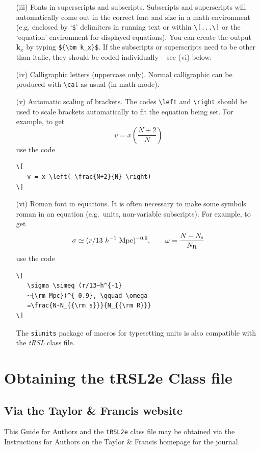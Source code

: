 \documentclass[]{tRSL2e}
\begin{document}
\begin{enumerate}
\item[(iii)] Fonts in superscripts and subscripts. Subscripts and superscripts will automatically come  out in the correct font
and size in a math environment (e.g. enclosed by `\verb"$"'
delimiters in running text or within \verb"\[...\]" or the
`equation' environment for displayed equations). You can create
the output ${\bm k_x}$ by typing \verb"${\bm k_x}$". If the
subscripts or superscripts need to be other than italic, they
should be coded individually -- see (vi) below.

\item[(iv)] Calligraphic letters (uppercase only).
%
%
Normal calligraphic can be produced with \verb"\cal" as usual (in
math mode).

\item[(v)] Automatic scaling of brackets. The codes \verb"\left" and
\verb"\right" should  be used to scale brackets automatically to
fit the equation being set. For example, to get
\[
   v = x \left( \frac{N+2}{N} \right)
\]
use the code
%
\begin{verbatim}
\[
   v = x \left( \frac{N+2}{N} \right)
\]
\end{verbatim}

\item[(vi)] Roman font in equations. It is often necessary to make some
symbols roman in an equation (e.g.\ units, non-variable
subscripts). For example, to get
\[
   \sigma \simeq (r/13~h^{-1}~{\rm Mpc})^{-0.9},
   \qquad \omega = \frac{N-N_{\rm s}}{N_{\rm R}}
\]
\noindent use the code
%
\begin{verbatim}
\[
   \sigma \simeq (r/13~h^{-1}
   ~{\rm Mpc})^{-0.9}, \qquad \omega
   =\frac{N-N_{{\rm s}}}{N_{{\rm R}}}
\]
\end{verbatim}
The {\tt siunits} package of macros for typesetting units is also compatible with the {\it tRSL} class file.
\end{enumerate}


\section{Obtaining the tRSL2e Class file}\label{FTP}

\subsection{Via the Taylor \& Francis website}

This Guide for Authors and the \verb"tRSL2e" class file may be obtained via the Instructions for Authors
on the Taylor \& Francis homepage for the journal.
\end{document}
